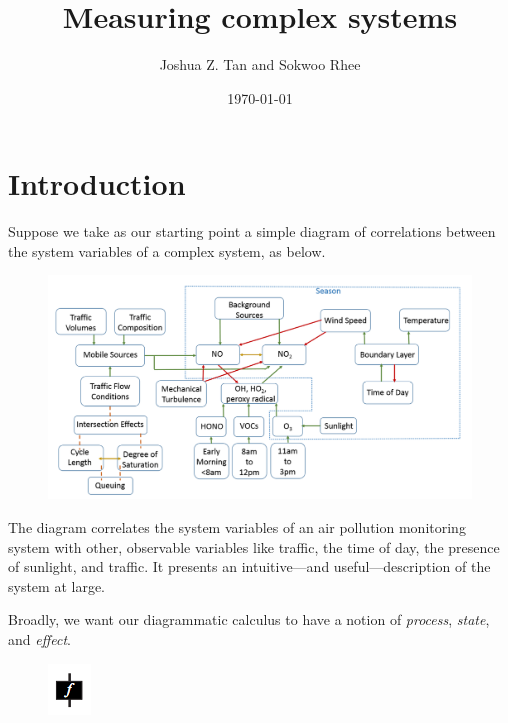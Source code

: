 \documentclass{sig-alternate-05-2015}
\title{Measuring complex systems}
\author{Joshua Z. Tan and Sokwoo Rhee}
\date{\today}
\theoremstyle{plain}
\theoremstyle{plain}
\theoremstyle{remark}
\begin{document}
\maketitle



\section{Introduction}
Suppose we take as our starting point a simple diagram of correlations between the system variables of a complex system, as below.

\begin{figure}[h!]
\includegraphics[width=\linewidth]{portland}
\end{figure}

The diagram correlates the system variables of an air pollution monitoring system with other, observable variables like traffic, the time of day, the presence of sunlight, and traffic. It presents an intuitive---and useful---description of the system at large.

Broadly, we want our diagrammatic calculus to have a notion of \emph{process}, \emph{state}, and \emph{effect}.

\begin{figure}[h!]
\centering
\includegraphics{process}
\end{figure}
\end{document}

